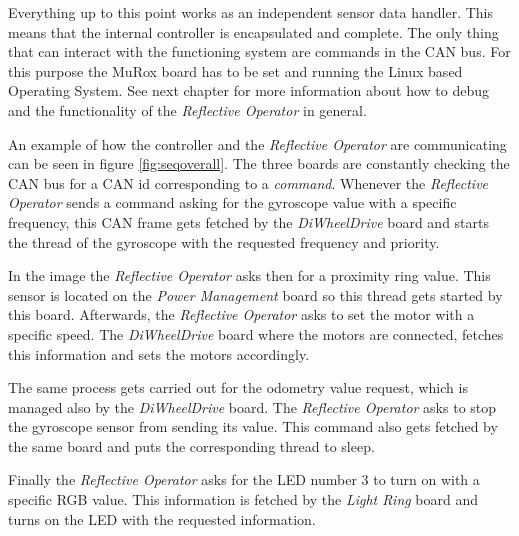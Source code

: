 \documentclass[12pt]{report}%
\begin{document}
Everything up to this point works as an independent sensor data handler. This means that the internal controller is encapsulated and complete. The only thing that can interact with the functioning system are commands in the CAN bus. For this purpose the MuRox board has to be set and running the Linux based Operating System. See next chapter for more information about how to debug and the functionality of the \textit{Reflective Operator} in general.

An example of how the controller and the \textit{Reflective Operator} are communicating can be seen in figure \ref{fig:seqoverall}. The three boards are constantly checking the CAN bus for a CAN id corresponding to a \textit{command}. Whenever the \textit{Reflective Operator} sends a command asking for the gyroscope value with a specific frequency, this CAN frame gets fetched by the \textit{DiWheelDrive} board and starts the thread of the gyroscope with the requested frequency and priority.

In the image the \textit{Reflective Operator} asks then for a proximity ring value. This sensor is located on the \textit{Power Management} board so this thread gets started by this board. Afterwards, the \textit{Reflective Operator} asks to set the motor with a specific speed. The \textit{DiWheelDrive} board where the motors are connected, fetches this information and sets the motors accordingly.

The same process gets carried out for the odometry value request, which is managed also by the \textit{DiWheelDrive} board. The \textit{Reflective Operator} asks to stop the gyroscope sensor from sending its value. This command also gets fetched by the same board and puts the corresponding thread to sleep.

Finally the \textit{Reflective Operator} asks for the LED number 3 to turn on with a specific RGB value. This information is fetched by the \textit{Light Ring} board and turns on the LED with the requested information.
\end{document}
